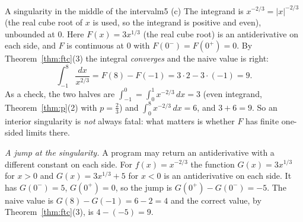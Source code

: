 \documentclass[11pt]{article}
\begin{document}
\begin{exmp}{A singularity in the middle of the interval}{m5}
(c) The integrand is $x^{-2/3}=\lvert x\rvert^{-2/3}$ (the real cube root of $x$ is used, so the integrand is positive and even), unbounded at $0$. Here $F(x)=3x^{1/3}$ (the real cube root) is an antiderivative on each side, and $F$ is continuous at $0$ with $F(0^-)=F(0^+)=0$. By Theorem~\ref{thm:ftc}(3) the integral \emph{converges} and the naive value is right:
\[\int_{-1}^8\frac{dx}{x^{2/3}}=F(8)-F(-1)=3\cdot2-3\cdot(-1)=9 .\]
As a check, the two halves are $\int_{-1}^0=\int_0^1x^{-2/3}\,dx=3$ (even integrand, Theorem~\ref{thm:p}(2) with $p=\frac23$) and $\int_0^8x^{-2/3}\,dx=6$, and $3+6=9$. So an interior singularity is \emph{not} always fatal: what matters is whether $F$ has finite one-sided limits there.

\emph{A jump at the singularity.} A program may return an antiderivative with a different constant on each side. For $f(x)=x^{-2/3}$ the function $G(x)=3x^{1/3}$ for $x>0$ and $G(x)=3x^{1/3}+5$ for $x<0$ is an antiderivative on each side. It has $G(0^-)=5$, $G(0^+)=0$, so the jump is $G(0^+)-G(0^-)=-5$. The naive value is $G(8)-G(-1)=6-2=4$ and the correct value, by Theorem~\ref{thm:ftc}(3), is $4-(-5)=9$.
\end{exmp}
\end{document}
